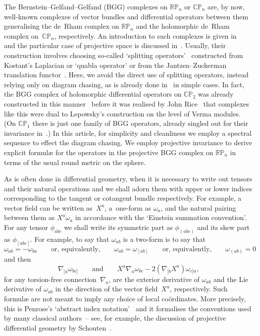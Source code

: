 \documentclass[pdftex]{sigma}
\begin{document}
The Bernstein--Gelfand--Gelfand (BGG) complexes on ${\mathbb{RP}}_n$ or
${\mathbb{CP}}_n$ are, by now, well-known complexes of vector bundles and
dif\/ferential operators between them generalising the de~Rham complex on
${\mathbb{RP}}_n$ and the holomorphic de~Rham complex on~${\mathbb{CP}}_n$,
respectively. An introduction to such complexes is given in~\cite{eVariations}
and the particular case of projective space is discussed in~\cite{eProjective}.
Usually, their construction involves choosing so-called `splitting
operators'~\cite{cd,css4} constructed from Kostant's Laplacian \cite{k} or
`quabla operator' \cite{cd} or from the Jantzen--Zuckerman translation
functor~\cite{v}. Here, we avoid the direct use of splitting operators, instead
relying only on diagram chasing, as is already done
in~\cite{eVariations,eProjective} in simple cases. In fact, the BGG complex of
holomorphic dif\/ferential operators on ${\mathbb{CP}}_2$ was already constructed
in this manner~\cite[p.~351]{eDuality} before it was realised by John
Rice~\cite{r} that complexes like this were dual to Lepowsky's construction
\cite{l} on the level of Verma modules. (On ${\mathbb{CP}}_1$ there is just one
family of BGG operators, already singled out for their invariance
in~\cite[Proposition~2.1]{et}.) In this article, for simplicity and cleanliness
we employ a spectral sequence to ef\/fect the diagram chasing. We employ
projective invariance to derive explicit formul{\ae} for the operators in the
projective BGG complex on ${\mathbb{RP}}_n$ in terms of the usual round metric
on the sphere.

As is often done in dif\/ferential geometry, when it is necessary to write out
tensors and their natural operations and we shall adorn them with upper or
lower indices corresponding to the tangent or cotangent bundle respectively.
For example, a vector f\/ield can be written as~$X^a$, a~one-form as $\omega_a$,
and the natural pairing between them as $X^a\omega_a$ in accordance with the
`Einstein summation convention'. For any tensor $\phi_{abc}$ we shall write its
symmetric part as $\phi_{(abc)}$ and its skew part as $\phi_{[abc]}$. For
example, to say that $\omega_{ab}$ is a two-form is to say that
\[\omega_{ab}=-\omega_{ba}\qquad
\mbox{or, equivalently,}\qquad\omega_{ab}=\omega_{[ab]}\qquad
\mbox{or, equivalently,}\qquad\omega_{(ab)}=0\]
and then
\[\nabla_{[a}\omega_{bc]}\qquad\mbox{and}\qquad
X^a\nabla_a\omega_{bc}-2(\nabla_{[b}X^a)\omega_{c]a},\]
for any torsion-free connection~$\nabla_a$, are the exterior derivative of
$\omega_{ab}$ and the Lie derivative of $\omega_{ab}$ in the direction of the
vector f\/ield~$X^a$, respectively. Such formul{\ae} are not meant to imply any
choice of local co\"ordinates. More precisely, this is Penrose's `abstract
index notation'~\cite{OT} and it formalises the conventions used by many
classical authors~-- see, for example, the discussion of projective dif\/ferential
geometry by Schouten~\cite{s}.
\end{document}
